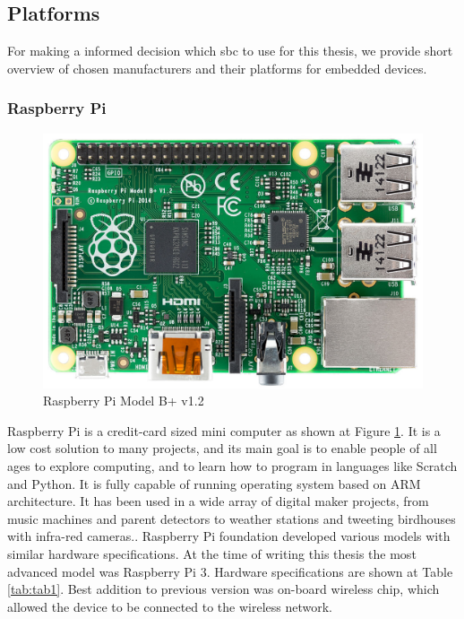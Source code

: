 \subsection{Platforms} %
\label{sub:platforms}
For making a informed decision which \gls{sbc} to use for this thesis, we provide short overview of chosen manufacturers and their platforms for embedded devices.
\subsubsection{Raspberry Pi} %
\label{ssub:raspberry_pi}
\begin{figure}[H]
\begin{center}
\captionsetup{font=small}
\includegraphics[scale=0.2]{pics/rasp.jpg}
\caption{Raspberry Pi Model B+ v1.2 \cite{pi_pic}}
\label{fig:ch3}
\end{center}
\end{figure}
Raspberry Pi is a credit-card sized mini computer as shown at Figure \ref{fig:ch3}. It is a low cost solution to many projects, and its main goal is to enable people of all ages to explore computing, and to learn how to program in languages like Scratch and Python. It is fully capable of running operating system based on ARM architecture. It has been used in a wide array of digital maker projects, from music machines and parent detectors to weather stations and tweeting birdhouses with infra-red cameras.\cite{raspberry_pi_what}. Raspberry Pi foundation developed various models with similar hardware specifications. At the time of writing this thesis the most advanced model was Raspberry Pi 3. Hardware specifications are shown at Table \ref{tab:tab1}. Best addition to previous version was on-board wireless chip, which allowed the device to be connected to the wireless network.

